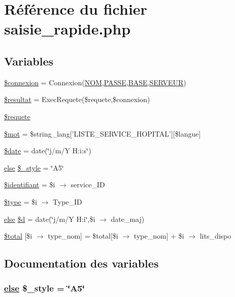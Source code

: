 \hypertarget{saisie__rapide_8php}{
\section{R\'{e}f\'{e}rence du fichier saisie\_\-rapide.php}
\label{saisie__rapide_8php}
}
\subsection*{Variables}
\begin{CompactItemize}
\item 
\hyperlink{saisie__rapide_8php_a0}{\$connexion} = Connexion(\hyperlink{pma__connect_8php_a0}{NOM},\hyperlink{pma__connect_8php_a1}{PASSE},\hyperlink{pma__connect_8php_a3}{BASE},\hyperlink{pma__connect_8php_a2}{SERVEUR})
\item 
\hyperlink{saisie__rapide_8php_a1}{\$resultat} = Exec\-Requete(\$requete,\$connexion)
\item 
\hyperlink{saisie__rapide_8php_a2}{\$requete}
\item 
\hyperlink{saisie__rapide_8php_a3}{\$mot} = \$string\_\-lang\mbox{[}'LISTE\_\-SERVICE\_\-HOPITAL'\mbox{]}\mbox{[}\$langue\mbox{]}
\item 
\hyperlink{saisie__rapide_8php_a4}{\$date} = date(\char`\"{}j/m/Y H:i:s\char`\"{})
\item 
\hyperlink{cron_8php_a9}{else} \hyperlink{saisie__rapide_8php_a5}{\$\_\-style} = \char`\"{}A5\char`\"{}
\item 
\hyperlink{saisie__rapide_8php_a6}{\$identifiant} = \$i $\rightarrow$ service\_\-ID
\item 
\hyperlink{saisie__rapide_8php_a7}{\$type} = \$i $\rightarrow$ Type\_\-ID
\item 
\hyperlink{cron_8php_a9}{else} \hyperlink{saisie__rapide_8php_a8}{\$d} = date(\char`\"{}j/m/Y H:i\char`\"{},\$i $\rightarrow$ date\_\-maj)
\item 
\hyperlink{saisie__rapide_8php_a9}{\$total} \mbox{[}\$i $\rightarrow$ type\_\-nom\mbox{]} = \$total\mbox{[}\$i $\rightarrow$ type\_\-nom\mbox{]} + \$i $\rightarrow$ lits\_\-dispo
\end{CompactItemize}


\subsection{Documentation des variables}
\hypertarget{saisie__rapide_8php_a5}{
\subsubsection[\$\_\-style]{\setlength{\rightskip}{0pt plus 5cm}\hyperlink{cron_8php_a9}{else} \$\_\-style = \char`\"{}A5\char`\"{}}}
\label{saisie__rapide_8php_a5}


